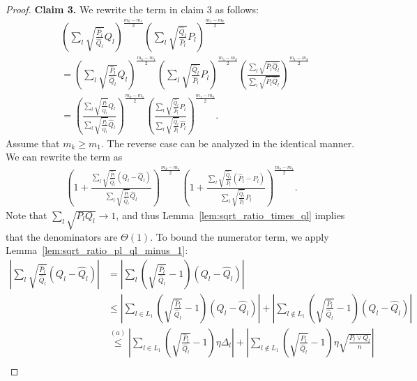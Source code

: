 \documentclass{article}
\begin{document}
\begin{proof}
\noindent \textbf{Claim 3.} 
We rewrite the term in claim 3 as follows:
\begin{align*}
& \left( \sum_l \sqrt{\frac{\hat{P}_l}{\hat{Q}_l}} Q_l \right)^{\frac{m_k - m_1}{2}} 
 \left( \sum_l \sqrt{\frac{\hat{Q}_l}{\hat{P}_l}} P_l \right)^{\frac{m_1 - m_k}{2}} \\
&= \left( \sum_l \sqrt{\frac{\hat{P}_l}{\hat{Q}_l}} Q_l \right)^{\frac{m_k - m_1}{2}} 
 \left( \sum_l \sqrt{\frac{\hat{Q}_l}{\hat{P}_l}} P_l \right)^{\frac{m_1 - m_k}{2}} 
   \left( \frac{\sum_l \sqrt{\hat{P}_l \hat{Q}_l}}{\sum_l \sqrt{\hat{P}_l \hat{Q}_l}} \right)^{\frac{m_1 - m_k}{2}} \\
&=  \left( 
   \frac{\sum_l \sqrt{\frac{\hat{P}_l}{\hat{Q}_l}} Q_l}
        {\sum_l \sqrt{\frac{\hat{P}_l}{\hat{Q}_l}} \hat{Q}_l} 
     \right)^{\frac{m_k - m_1}{2}} 
   \left( \frac{\sum_l \sqrt{\frac{\hat{Q}_l}{\hat{P}_l}} P_l}
         {\sum_l \sqrt{\frac{\hat{Q}_l}{\hat{P}_l}} \hat{P_l} } \right)^{\frac{m_1 - m_k}{2}}. 
\end{align*}
Assume that $m_k \geq m_1$. The reverse case can be analyzed in the identical manner. We can rewrite the term as
\begin{align*}
\left( 1 + 
   \frac{\sum_l \sqrt{\frac{\hat{P}_l}{\hat{Q}_l}} (Q_l - \hat{Q}_l)}
        {\sum_l \sqrt{\frac{\hat{P}_l}{\hat{Q}_l}} \hat{Q}_l} 
     \right)^{\frac{m_k - m_1}{2}} 
   \left( 1+ \frac{\sum_l \sqrt{\frac{\hat{Q}_l}{\hat{P}_l}} (\hat{P}_l - P_l)}
         {\sum_l \sqrt{\frac{\hat{Q}_l}{\hat{P}_l}} P_l } \right)^{\frac{m_k - m_1}{2}}. 
\end{align*}
Note that $\sum_l \sqrt{P_l Q_l} \to 1$, and thus Lemma~\ref{lem:sqrt_ratio_times_ql} implies that the denominators are $\Theta(1).$ To bound the numerator term, we apply Lemma~\ref{lem:sqrt_ratio_pl_ql_minus_1}:
\begin{align*}
\left| \sum_l \sqrt{\frac{\hat{P}_l}{\hat{Q}_l}} (Q_l - \hat{Q}_l) \right|  &= 
  \left|  \sum_l \left( \sqrt{\frac{\hat{P}_l}{\hat{Q}_l}} -1 \right) (Q_l - \hat{Q}_l) 
 \right| \\
& \leq \left| \sum_{l \in L_1} \left( \sqrt{\frac{\hat{P}_l}{\hat{Q}_l}} -1 \right) (Q_l - \hat{Q}_l) \right| +  %
  \left| \sum_{l \notin L_1} \left( \sqrt{\frac{\hat{P}_l}{\hat{Q}_l}} -1 \right) (Q_l - \hat{Q}_l) \right| \\
%
& \stackrel{(a)} \leq \left| \sum_{l \in L_1} \left( \sqrt{\frac{\hat{P}_l}{\hat{Q}_l}} -1 \right) \eta \Delta_l \right| +  %
  \left| \sum_{l \notin L_1} \left( \sqrt{\frac{\hat{P}_l}{\hat{Q}_l}} -1 \right) \eta \sqrt{ \frac{P_l \vee Q_l}{n}}  \right| \\

\end{align*}
\end{proof}
\end{document}
